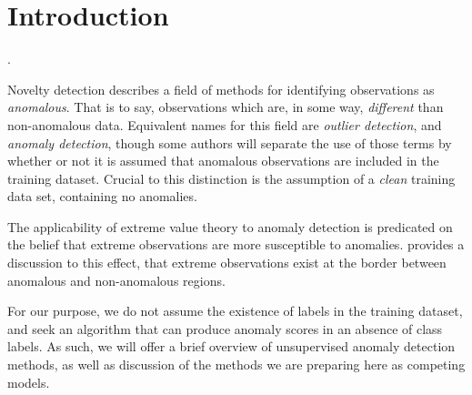 \section{Introduction}
.

Novelty detection describes a field of methods for identifying observations as \emph{anomalous}.  That
  is to say, observations which are, in some way, \emph{different} than non-anomalous data.
  Equivalent names for this field are \emph{outlier detection}, and \emph{anomaly detection}, though
  some authors will separate the use of those terms by whether or not it is assumed that anomalous
  observations are included in the training dataset.  Crucial to this distinction is the assumption
  of a \emph{clean} training data set, containing no anomalies.

The applicability of extreme value theory to anomaly detection is predicated on the belief that
  extreme observations are more susceptible to anomalies.  \cite{goix2017} provides a discussion to
  this effect, that extreme observations exist at the border between anomalous and non-anomalous regions.

For our purpose, we do not assume the existence of labels in the training dataset, and seek an
  algorithm that can produce anomaly scores in an absence of class labels. As such, we will offer
  a brief overview of unsupervised anomaly detection methods, as well as discussion of the methods
  we are preparing here as competing models.












